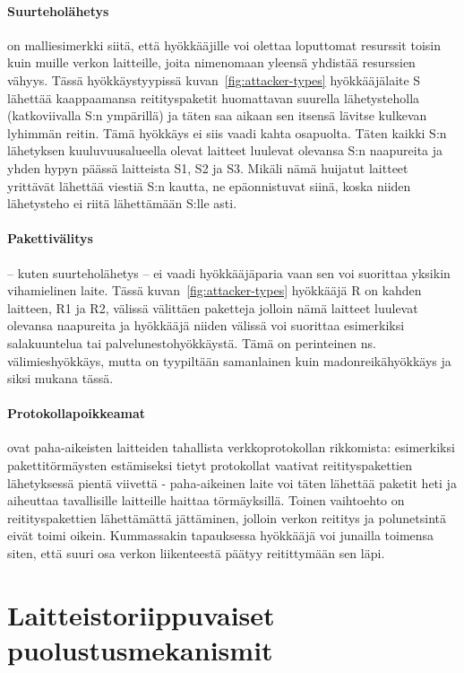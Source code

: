 \documentclass[finnish]{tktltiki2}
\theoremstyle{definition}
\theoremstyle{remark}
\begin{document}
\paragraph{Suurteholähetys} on malliesimerkki siitä, että hyökkääjille voi olettaa loputtomat resurssit toisin kuin muille verkon laitteille, joita nimenomaan yleensä yhdistää resurssien vähyys. Tässä hyökkäystyypissä kuvan~\ref{fig:attacker-types} hyökkääjälaite S lähettää kaappaamansa reitityspaketit huomattavan suurella lähetysteholla (katkoviivalla S:n ympärillä) ja täten saa aikaan sen itsensä lävitse kulkevan lyhimmän reitin. Tämä hyökkäys ei siis vaadi kahta osapuolta. Täten kaikki S:n lähetyksen kuuluvuusalueella olevat laitteet luulevat olevansa S:n naapureita ja yhden hypyn päässä laitteista S1, S2 ja S3. Mikäli nämä huijatut laitteet yrittävät lähettää viestiä S:n kautta, ne epäonnistuvat siinä, koska niiden lähetysteho ei riitä lähettämään S:lle asti.

\paragraph{Pakettivälitys} -- kuten suurteholähetys -- ei vaadi hyökkääjäparia vaan sen voi suorittaa yksikin vihamielinen laite. Tässä kuvan~\ref{fig:attacker-types} hyökkääjä R on kahden laitteen, R1 ja R2, välissä välittäen paketteja jolloin nämä laitteet luulevat olevansa naapureita ja hyökkääjä niiden välissä voi suorittaa esimerkiksi salakuuntelua tai palvelunestohyökkäystä. Tämä on perinteinen ns. välimieshyökkäys, mutta on tyypiltään samanlainen kuin madonreikähyökkäys ja siksi mukana tässä.

\paragraph{Protokollapoikkeamat} ovat paha-aikeisten laitteiden tahallista verkkoprotokollan rikkomista: esimerkiksi pakettitörmäysten estämiseksi tietyt protokollat vaativat reitityspakettien lähetyksessä pientä viivettä - paha-aikeinen laite voi täten lähettää paketit heti ja aiheuttaa tavallisille laitteille haittaa törmäyksillä. Toinen vaihtoehto on reitityspakettien lähettämättä jättäminen, jolloin verkon reititys ja polunetsintä eivät toimi oikein. Kummassakin tapauksessa hyökkääjä voi junailla toimensa siten, että suuri osa verkon liikenteestä päätyy reitittymään sen läpi.


\section{Laitteistoriippuvaiset puolustusmekanismit}
\end{document}
